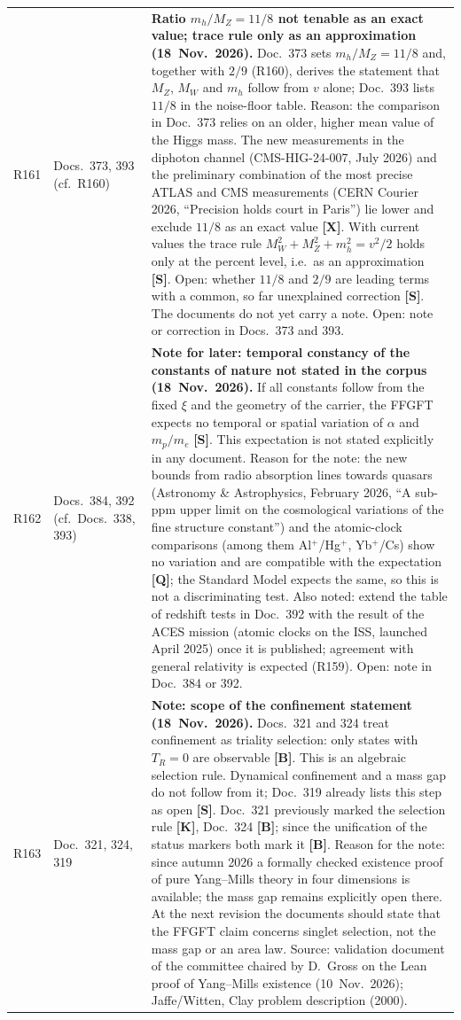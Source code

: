 \begin{longtable}{@{}p{0.9cm}p{3.1cm}p{10.2cm}@{}}
R161 & Docs.~373, 393 (cf.\ R160) & \textbf{Ratio $m_h/M_Z=11/8$ not tenable as an exact value; trace rule only as an approximation (18~Nov.~2026).} Doc.~373 sets $m_h/M_Z=11/8$ and, together with $2/9$ (R160), derives the statement that $M_Z$, $M_W$ and $m_h$ follow from $v$ alone; Doc.~393 lists $11/8$ in the noise-floor table. Reason: the comparison in Doc.~373 relies on an older, higher mean value of the Higgs mass. The new measurements in the diphoton channel (CMS-HIG-24-007, July 2026) and the preliminary combination of the most precise ATLAS and CMS measurements (CERN Courier 2026, \enquote{Precision holds court in Paris}) lie lower and exclude $11/8$ as an exact value \textbf{[X]}. With current values the trace rule $M_W^2+M_Z^2+m_h^2=v^2/2$ holds only at the percent level, i.e.\ as an approximation \textbf{[S]}. Open: whether $11/8$ and $2/9$ are leading terms with a common, so far unexplained correction \textbf{[S]}. The documents do not yet carry a note. Open: note or correction in Docs.~373 and 393. \\
R162 & Docs.~384, 392 (cf.\ Docs.~338, 393) & \textbf{Note for later: temporal constancy of the constants of nature not stated in the corpus (18~Nov.~2026).} If all constants follow from the fixed $\xi$ and the geometry of the carrier, the FFGFT expects no temporal or spatial variation of $\alpha$ and $m_p/m_e$ \textbf{[S]}. This expectation is not stated explicitly in any document. Reason for the note: the new bounds from radio absorption lines towards quasars (Astronomy \& Astrophysics, February 2026, \enquote{A sub-ppm upper limit on the cosmological variations of the fine structure constant}) and the atomic-clock comparisons (among them Al$^+$/Hg$^+$, Yb$^+$/Cs) show no variation and are compatible with the expectation \textbf{[Q]}; the Standard Model expects the same, so this is not a discriminating test. Also noted: extend the table of redshift tests in Doc.~392 with the result of the ACES mission (atomic clocks on the ISS, launched April 2025) once it is published; agreement with general relativity is expected (R159). Open: note in Doc.~384 or 392. \\
R163 & Doc.~321, 324, 319 & \textbf{Note: scope of the confinement statement (18~Nov.~2026).} Docs.~321 and 324 treat confinement as triality selection: only states with $T_R=0$ are observable \textbf{[B]}. This is an algebraic selection rule. Dynamical confinement and a mass gap do not follow from it; Doc.~319 already lists this step as open \textbf{[S]}. Doc.~321 previously marked the selection rule \textbf{[K]}, Doc.~324 \textbf{[B]}; since the unification of the status markers both mark it \textbf{[B]}. Reason for the note: since autumn 2026 a formally checked existence proof of pure Yang--Mills theory in four dimensions is available; the mass gap remains explicitly open there. At the next revision the documents should state that the FFGFT claim concerns singlet selection, not the mass gap or an area law. Source: validation document of the committee chaired by D.~Gross on the Lean proof of Yang--Mills existence (10~Nov.~2026); Jaffe/Witten, Clay problem description (2000). \\

\end{longtable}
